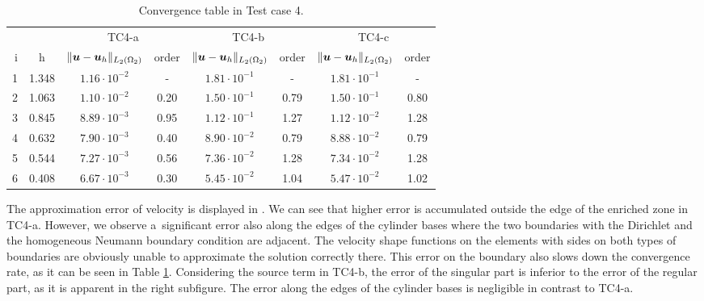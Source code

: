 \begin{table}[!htb]
\begin{center}
\bgroup
\def\arraystretch{1.2}
\setlength\tabcolsep{5pt}
\begin{tabular}{rc|cc|cc|cc}
\toprule
\multicolumn{2}{c|}{} & \multicolumn{2}{c|}{ TC4-a } & \multicolumn{2}{c|}{ TC4-b } & \multicolumn{2}{c}{TC4-c}\\ [3pt] %
i & h & $\|\mathbf{\boldsymbol{u}}-\mathbf{\boldsymbol{u}}_h\|_{L_2(\Omega_2)}$ & order & $\|\mathbf{\boldsymbol{u}}-\mathbf{\boldsymbol{u}}_h\|_{L_2(\Omega_2)}$
    & order & $\|\mathbf{\boldsymbol{u}}-\mathbf{\boldsymbol{u}}_h\|_{L_2(\Omega_2)}$ & order \\ [3pt] \midrule
1 & 1.348 &  $1.16\cdot10^{-2}$  &  -   &  $1.81\cdot10^{-1}$  &  -   &  $1.81\cdot10^{-1}$ &   -   \\
2 & 1.063 &  $1.10\cdot10^{-2}$  & 0.20 &  $1.50\cdot10^{-1}$  & 0.79 &  $1.50\cdot10^{-1}$ &  0.80 \\
3 & 0.845 &  $8.89\cdot10^{-3}$  & 0.95 &  $1.12\cdot10^{-1}$  & 1.27 &  $1.12\cdot10^{-2}$ &  1.28 \\
4 & 0.632 &  $7.90\cdot10^{-3}$  & 0.40 &  $8.90\cdot10^{-2}$  & 0.79 &  $8.88\cdot10^{-2}$ &  0.79 \\
5 & 0.544 &  $7.27\cdot10^{-3}$  & 0.56 &  $7.36\cdot10^{-2}$  & 1.28 &  $7.34\cdot10^{-2}$ &  1.28 \\
6 & 0.408 &  $6.67\cdot10^{-3}$  & 0.30 &  $5.45\cdot10^{-2}$  & 1.04 &  $5.47\cdot10^{-2}$ &  1.02 \\
\bottomrule
\end{tabular}
\caption{Convergence table in Test case 4.}
\label{tab:mh_tc4_convergence}
\egroup
\end{center}
\end{table}

The approximation error of velocity is displayed in . We can see that higher
error is accumulated outside the edge of the enriched zone in TC4-a. However, we observe a~significant error also
along the edges of the cylinder bases where the two boundaries with the Dirichlet and the homogeneous Neumann boundary condition
are adjacent. The velocity shape functions on the elements with sides on both types of boundaries are obviously unable to approximate
the solution correctly there. This error on the boundary also slows down the convergence rate, as it can be seen in Table \ref{tab:mh_tc4_convergence}.
Considering the source term in TC4-b, the error of the singular part is inferior to the error of the regular part, as it is apparent
in the right subfigure. The error along the edges of the cylinder bases is negligible in contrast to TC4-a.



